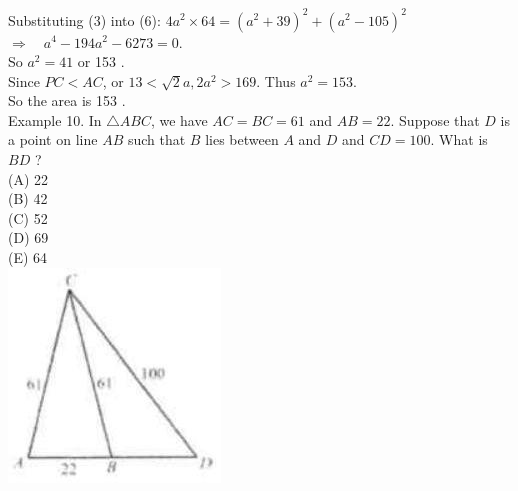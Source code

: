 \documentclass[10pt]{article}
\begin{document}
Substituting (3) into (6): \(4 a^{2} \times 64=\left(a^{2}+39\right)^{2}+\left(a^{2}-105\right)^{2}\)\\
\(\Rightarrow \quad a^{4}-194 a^{2}-6273=0\).\\
So \(a^{2}=41\) or 153 .\\
Since \(P C<A C\), or \(13<\sqrt{2} a, 2 a^{2}>169\). Thus \(a^{2}=153\).\\
So the area is 153 .\\
Example 10. In \(\triangle A B C\), we have \(A C=B C=61\) and \(A B=22\). Suppose that \(D\) is a point on line \(A B\) such that \(B\) lies between \(A\) and \(D\) and \(C D=100\). What is \(B D\) ?\\
(A) 22\\
(B) 42\\
(C) 52\\
(D) 69\\
(E) 64\\
\includegraphics[max width=\textwidth, center]{2025_04_17_97bc1f7e44d93c271a88g-080}
\end{document}
